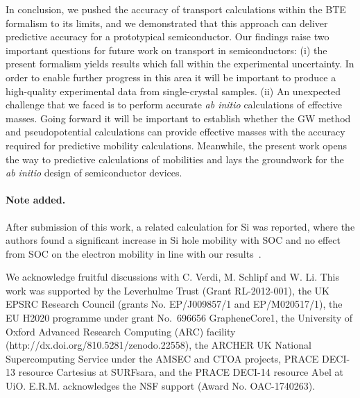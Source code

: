\documentclass[aps,prl,twocolumn,superscriptaddress]{revtex4-1}
\begin{document}
In conclusion, we pushed the accuracy of transport calculations within the BTE formalism to its limits,
and we demonstrated that this approach can deliver predictive accuracy for a prototypical semiconductor. 
Our findings raise two important 
questions for future work on transport in semiconductors: (i) the present formalism yields results
which fall within the experimental uncertainty. In order to enable further progress in this area
it will be important to produce a high-quality experimental data from single-crystal
samples. (ii) An unexpected challenge that we faced is to perform accurate \textit{ab initio}
calculations of effective masses. Going forward it will be important to establish whether the GW method 
and pseudopotential calculations can provide
effective masses with the accuracy required for predictive mobility calculations. 
Meanwhile, the present work opens the way to predictive calculations of mobilities and lays the
groundwork for the {\it ab initio} design of semiconductor devices.

\paragraph{Note added.} After submission of this work, a related calculation for Si
was reported, where the authors found a significant increase in Si hole mobility with SOC and no effect
from SOC on the electron mobility in line with our results~\cite{Ma2018}.

\begin{acknowledgments}
We acknowledge fruitful discussions with C. Verdi, M. Schlipf and W. Li.
This work was supported by the Leverhulme Trust (Grant RL-2012-001), the UK EPSRC Research Council 
(grants No. EP/J009857/1 and EP/M020517/1), the EU H2020
programme under grant No.~696656 GrapheneCore1, the University of Oxford Advanced Research Computing (ARC) 
facility (http://dx.doi.org/810.5281/zenodo.22558), the ARCHER UK National Supercomputing Service under 
the AMSEC and CTOA projects, PRACE DECI-13 resource Cartesius at SURFsara, and the PRACE DECI-14 resource 
Abel at UiO. E.R.M. acknowledges the NSF support (Award No. OAC-1740263).
\end{acknowledgments}



\end{document}
